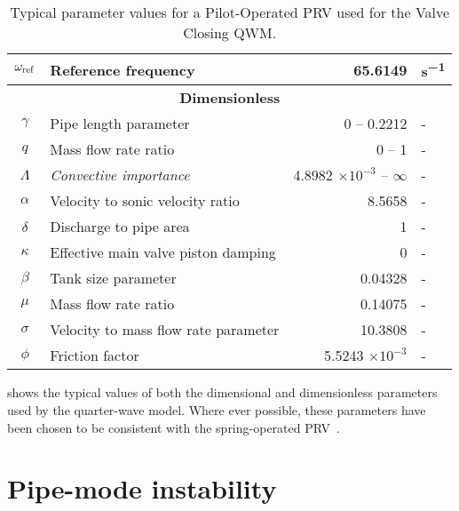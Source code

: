\begin{table}[ht]
\begin{tabular}{c|l|r|l}
        $\omega_{\rm{ref}}$ & Reference frequency & 65.6149 & \si{s^{-1}} \\ \hline \hline
        \multicolumn{4}{c}{\textbf{Dimensionless}} \\ \hline
        $\gamma$ & Pipe length parameter & 0 -- 0.2212 & - \\ \hline
        $q$ & Mass flow rate ratio & 0 -- 1 & - \\ \hline
        $\Lambda$ & \textit{Convective importance} & 4.8982 $\times 10^{-3}$ -- $\infty$ & - \\ \hline
        $\alpha$ & Velocity to sonic velocity ratio & 8.5658 & - \\ \hline
        $\delta$ & Discharge to pipe area & 1 & - \\ \hline
        $\kappa$ & Effective main valve piston damping & 0 & - \\ \hline
        $\beta$ & Tank size parameter & 0.04328 & - \\ \hline
        $\mu$ & Mass flow rate ratio & 0.14075 & - \\ \hline
        $\sigma$ & Velocity to mass flow rate parameter & 10.3808 & - \\ \hline
        $\phi$ & Friction factor & 5.5243 $\times 10^{-3}$ & - \\
    \end{tabular}
    \caption{Typical parameter values for a Pilot-Operated PRV used for the Valve Closing QWM.}
    \label{tab: ValveClosingQWMParameterValues}
\end{table}

 shows the typical values of both the dimensional and dimensionless parameters used by the quarter-wave model. Where ever possible, these parameters have been chosen to be consistent with the spring-operated PRV~\cite{Hos2016DynamicService}.

\section{Pipe-mode instability} \label{subsec: QWMAnalyticalBound}


